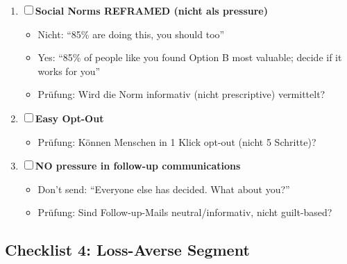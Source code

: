 \begin{tcolorbox}[colback=blue!5!white, colframe=blue!75!black, title=\textbf{Deployment Checklist: Autonomy-Seeking (KRITISCH!)}]
\begin{enumerate}[label=\textbf{AS-\arabic*}]
\item ☐ \textbf{Social Norms REFRAMED (nicht als pressure)}
  \begin{itemize}[nosep]
  \item Nicht: ``85\% are doing this, you should too''
  \item Yes: ``85\% of people like you found Option B most valuable; decide if it works for you''
  \item Prüfung: Wird die Norm informativ (nicht prescriptive) vermittelt?
  \end{itemize}

\item ☐ \textbf{Easy Opt-Out}
  \begin{itemize}[nosep]
  \item Prüfung: Können Menschen in 1 Klick opt-out (nicht 5 Schritte)?
  \end{itemize}

\item ☐ \textbf{NO pressure in follow-up communications}
  \begin{itemize}[nosep]
  \item Don't send: ``Everyone else has decided. What about you?''
  \item Prüfung: Sind Follow-up-Mails neutral/informativ, nicht guilt-based?
  \end{itemize}
\end{enumerate}

\end{tcolorbox}

\subsection{Checklist 4: Loss-Averse Segment}


